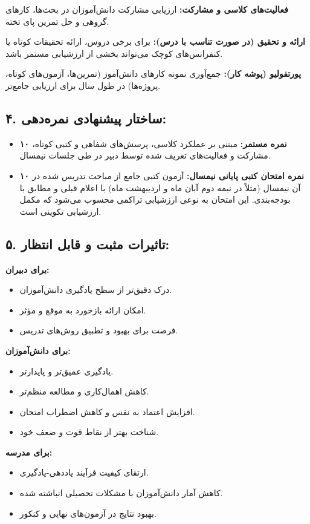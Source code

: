 \documentclass[a4paper]{article}
\begin{document}
\textbf{فعالیت‌های کلاسی و مشارکت:} ارزیابی مشارکت دانش‌آموزان در بحث‌ها، کارهای گروهی و حل تمرین پای تخته.

\textbf{ارائه و تحقیق (در صورت تناسب با درس):} برای برخی دروس، ارائه تحقیقات کوتاه یا کنفرانس‌های کوچک می‌تواند بخشی از ارزشیابی مستمر باشد.

\textbf{پورتفولیو (پوشه کار):} جمع‌آوری نمونه کارهای دانش‌آموز (تمرین‌ها، آزمون‌های کوتاه، پروژه‌ها) در طول سال برای ارزیابی جامع‌تر.
\medskip

\subsection*{۴. ساختار پیشنهادی نمره‌دهی:}
\begin{itemize}
    \item \textbf{۱۰ نمره مستمر:} مبتنی بر عملکرد کلاسی، پرسش‌های شفاهی و کتبی کوتاه، مشارکت و فعالیت‌های تعریف شده توسط دبیر در طی جلسات نیمسال.
    \item \textbf{۱۰ نمره امتحان کتبی پایانی نیمسال:} آزمون کتبی جامع از مباحث تدریس شده در آن نیمسال (مثلاً در نیمه دوم آبان ماه و اردیبهشت ماه) با اعلام قبلی و مطابق با بودجه‌بندی. این امتحان به نوعی ارزشیابی تراکمی محسوب می‌شود که مکمل ارزشیابی تکوینی است.
\end{itemize}
\medskip

\subsection*{۵. تاثیرات مثبت و قابل انتظار:}
\textbf{برای دبیران:}
\begin{itemize}
    \item درک دقیق‌تر از سطح یادگیری دانش‌آموزان.
    \item امکان ارائه بازخورد به موقع و مؤثر.
    \item فرصت برای بهبود و تطبیق روش‌های تدریس.
\end{itemize}
\textbf{برای دانش‌آموزان:}
\begin{itemize}
    \item یادگیری عمیق‌تر و پایدارتر.
    \item کاهش اهمال‌کاری و مطالعه منظم‌تر.
    \item افزایش اعتماد به نفس و کاهش اضطراب امتحان.
    \item شناخت بهتر از نقاط قوت و ضعف خود.
\end{itemize}
\textbf{برای مدرسه:}
\begin{itemize}
    \item ارتقای کیفیت فرآیند یاددهی-یادگیری.
    \item کاهش آمار دانش‌آموزان با مشکلات تحصیلی انباشته شده.
    \item بهبود نتایج در آزمون‌های نهایی و کنکور.
\end{itemize}
\bigskip
\end{document}
